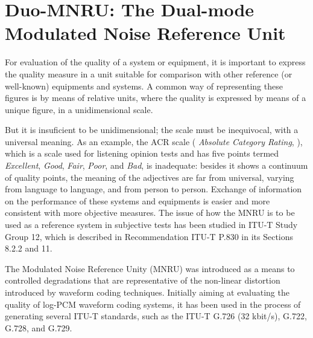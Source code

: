 
\chapter{Duo-MNRU: The Dual-mode Modulated Noise Reference Unit}

For evaluation of the quality of a system or equipment, it is
important to express the quality measure in a unit suitable for
comparison with other reference (or well-known) equipments and
systems. A common way of representing these figures is by means of
relative units, where the quality is expressed by means of a unique
figure, in a unidimensional scale.

But it is insuficient to be unidimensional; the scale must be
inequivocal, with a universal meaning. As an example, the ACR scale ({\em
Absolute Category Rating}, \cite[Annex B]{P.800}), which is a scale
used for listening opinion tests and has five points termed {\em
Excellent}, {\em Good}, {\em Fair}, {\em Poor}, and {\em Bad}, is
inadequate: besides it shows a continuum of quality points, the meaning
of the adjectives are far from universal, varying from language to
language, and from person to person. Exchange of information on the
performance of these systems and equipments is easier and more
consistent with more objective measures. The issue of how the MNRU is
to be used as a reference system in subjective tests has been studied
in ITU-T Study Group 12, which is described in
Recommendation ITU-T P.830 \cite{P.830} in its Sections 8.2.2 and 11.

The Modulated Noise Reference Unity (MNRU) was introduced as a means
to controlled degradations that are representative of the non-linear
distortion introduced by waveform coding techniques. Initially aiming
at evaluating the quality of log-PCM waveform coding systems, it has
been used in the process of generating several ITU-T standards, such
as the ITU-T G.726 (32 kbit/s), G.722, G.728, and G.729.

